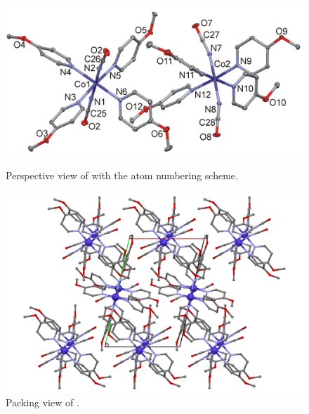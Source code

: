 \begin{figure}[!htpb]
\centering
\includegraphics[width=1\textwidth]{figures/coomop_FIGm11.png}
\caption[Perspective view of ]{Perspective view of  with the atom numbering scheme.}
\label{fig:CoO4MOP_pv}
\vspace{\floatsep}
\includegraphics[width=1\textwidth]{figures/coomop_CC.png}
\caption{Packing view  of .}
\label{fig:CoO4MOP_packv}
\end{figure}


